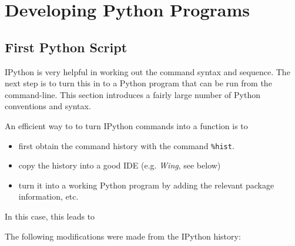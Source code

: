 \section{Developing Python Programs}

\subsection{First Python Script}

IPython is very helpful in working out the command syntax and sequence. The next step is to turn this in to a Python program that can be run from the command-line. This section introduces a fairly large number of Python conventions and syntax.

An efficient way to to turn IPython commands into a function is to

\begin{itemize}
  \item first obtain the command history with the command \lstinline{%hist}.
  \item copy the history into a good IDE (e.g. \emph{Wing}, see below)
  \item turn it into a working Python program by adding the relevant package information, etc.
\end{itemize}

In this case, this leads to



The following modifications were made from the IPython history:

